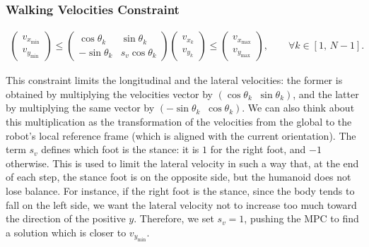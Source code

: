 \subsubsection{Walking Velocities Constraint}\label{subsec:walk_vel_constr}
\begin{align}
    \begin{pmatrix}
        v_{x_{\min}} \\[1ex]
        v_{y_{\min}}
    \end{pmatrix}
    \le
    \begin{pmatrix}
        \cos\theta_{k} & \sin\theta_{k} \\[1ex]
        -\sin\theta_{k} & s_{v}\cos\theta_{k}
    \end{pmatrix}
    \begin{pmatrix}
        v_{x_{k}} \\[1ex]
        v_{y_{k}}
    \end{pmatrix}
    \le
    \begin{pmatrix}
        v_{x_{\max}} \\[1ex]
        v_{y_{\max}}
    \end{pmatrix}
    , \qquad \forall k \in \left[ 1,\, N-1\right].
\end{align}

This constraint limits the longitudinal and the lateral velocities: the former is obtained by multiplying the velocities vector by $\left(\cos{\theta_k} \;\;\sin{\theta_k}\right)$, and the latter by multiplying the same vector by $\left(-\sin{\theta_k}\;\;\cos{\theta_k}\right)$.
We can also think about this multiplication as the transformation of the velocities from the global to the robot's local reference frame (which is aligned with the current orientation).
The term $s_v$ defines which foot is the stance: it is $1$ for the right foot, and $-1$ otherwise. This is used to limit the lateral velocity in such a way that, at the end of each step, the stance foot is on the opposite side, but the humanoid does not lose balance.
For instance, if the right foot is the stance, since the body tends to fall on the left side, we want the lateral velocity not to increase too much toward the direction of the positive $y$. Therefore, we set $s_v=1$, pushing the MPC to find a solution which is closer to $v_{y_{\min}}$.

